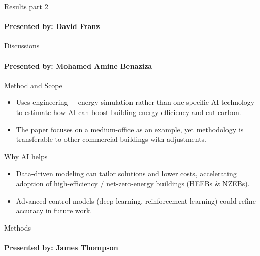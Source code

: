 \documentclass{beamer}
\begin{document}
\begin{frame}{Results part 2}
\framesubtitle{Presented by: David Franz}


\end{frame}

\begin{frame}{Discussions}
\framesubtitle{Presented by: Mohamed Amine Benaziza}

Method and Scope
\begin{itemize}
    \item Uses engineering + energy-simulation rather than one specific AI technology to estimate how AI can boost building-energy efficiency and cut carbon.
    \item The paper focuses on a medium-office as an example, yet methodology is transferable to other commercial buildings with adjustments.
\end{itemize}
\pause %
Why AI helps
\begin{itemize}[<+->] %
    \item Data-driven modeling can tailor solutions and lower costs, accelerating adoption of high-efficiency / net-zero-energy buildings (HEEBs \& NZEBs).
    \item Advanced control models (deep learning, reinforcement learning) could refine accuracy in future work.
\end{itemize}

\end{frame}

\begin{frame}{Methods}
\framesubtitle{Presented by: James Thompson}

\end{frame}
\end{document}
